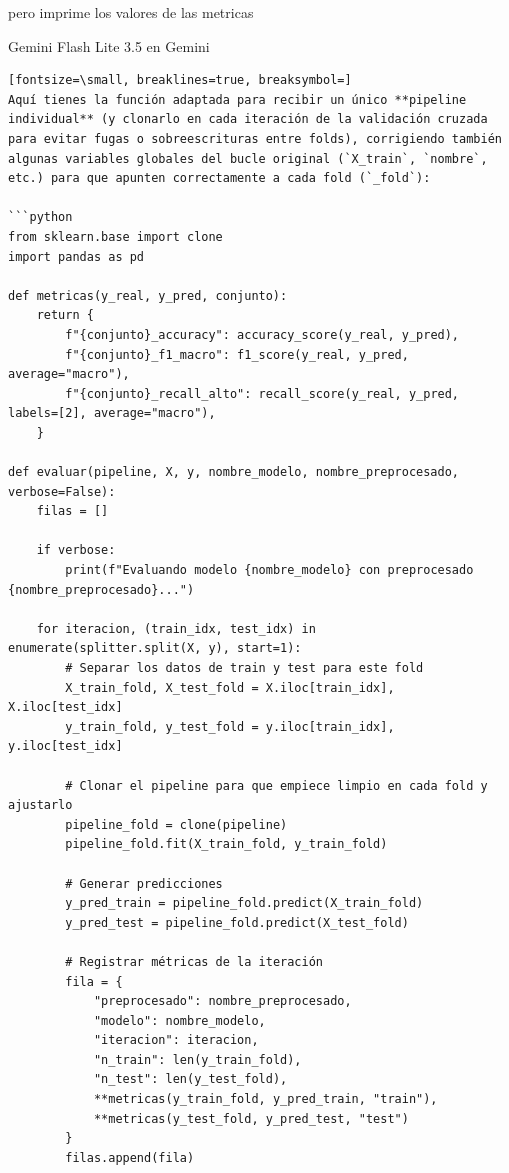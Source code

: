 \documentclass[12pt,a4paper,oneside]{book}
\begin{document}
\begin{iaprompt}
pero imprime los valores de las metricas
\end{iaprompt}
\begin{iaresp}{Gemini Flash Lite 3.5 en Gemini}
\begin{Verbatim}[fontsize=\small, breaklines=true, breaksymbol=]
Aquí tienes la función adaptada para recibir un único **pipeline individual** (y clonarlo en cada iteración de la validación cruzada para evitar fugas o sobreescrituras entre folds), corrigiendo también algunas variables globales del bucle original (`X_train`, `nombre`, etc.) para que apunten correctamente a cada fold (`_fold`):

```python
from sklearn.base import clone
import pandas as pd

def metricas(y_real, y_pred, conjunto):
    return {
        f"{conjunto}_accuracy": accuracy_score(y_real, y_pred),
        f"{conjunto}_f1_macro": f1_score(y_real, y_pred, average="macro"),
        f"{conjunto}_recall_alto": recall_score(y_real, y_pred, labels=[2], average="macro"),
    }

def evaluar(pipeline, X, y, nombre_modelo, nombre_preprocesado, verbose=False):
    filas = []
    
    if verbose:
        print(f"Evaluando modelo {nombre_modelo} con preprocesado {nombre_preprocesado}...")
        
    for iteracion, (train_idx, test_idx) in enumerate(splitter.split(X, y), start=1):
        # Separar los datos de train y test para este fold
        X_train_fold, X_test_fold = X.iloc[train_idx], X.iloc[test_idx]
        y_train_fold, y_test_fold = y.iloc[train_idx], y.iloc[test_idx]
        
        # Clonar el pipeline para que empiece limpio en cada fold y ajustarlo
        pipeline_fold = clone(pipeline)
        pipeline_fold.fit(X_train_fold, y_train_fold)
        
        # Generar predicciones
        y_pred_train = pipeline_fold.predict(X_train_fold)
        y_pred_test = pipeline_fold.predict(X_test_fold)
        
        # Registrar métricas de la iteración
        fila = {
            "preprocesado": nombre_preprocesado,
            "modelo": nombre_modelo, 
            "iteracion": iteracion,
            "n_train": len(y_train_fold), 
            "n_test": len(y_test_fold),
            **metricas(y_train_fold, y_pred_train, "train"),
            **metricas(y_test_fold, y_pred_test, "test")
        }
        filas.append(fila)
        

\end{Verbatim}
\end{iaresp}
\end{document}
